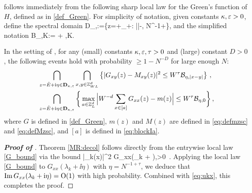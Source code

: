


 follows immediately from the following sharp local law for the Green's function of $H$, defined as in \eqref{def_Green}. For simplicity of notation, given constants $\kappa,{\varepsilon}>0$, define the spectral domain 
\be\label{eq:spectral_domain}
\mathbf D_{\kappa,\e}:=\{z=+\ii\eta \in \C_+: ||-\kappa, N^{-1+\e}\le \eta{}\},
\ee
and the simplified notation 
\be\label{eq:calBetaK}\cal B_{\eta,K}:=  + ,\quad \forall K.\ee

\begin{theorem}\label{MR:locSC} 
In the setting of , for any (small) constants $\kappa,{\varepsilon}, \tau>0$ and (large) constant $D>0$, the following events hold with probability $\ge 1-N^{-D}$ for large enough $N$: 
\begin{align}\label{G_bound}
&\bigcap_{z=\hat{E}+\mathrm{i}\eta\in \mathbf D_{\kappa,{\varepsilon}}}\bigcap_{x,y\in {\mathbb Z}_{WL}^d} \left\{ |G_{xy}(z) - M_{xy}(z)|^2  \le W^\tau  \mathcal B_{\eta,|x-y|}\right\}\, , 
\\
\label{G_bound_ave}
&\bigcap_{z=\hat{E}+\mathrm{i}\eta\in \mathbf D_{\kappa,{\varepsilon}}}\bigg\{\max_{a\in{\mathbb Z}_L^d} \Big|W^{-d}\sum_{x\in [a]}G_{xx}(z) - m(z) \Big| \le W^\tau  \mathcal B_{\eta,0}\bigg\}\, , 
\end{align}
where $G$ is defined in \eqref{def_Green}, $m(z)$ and $M(z)$ are defined in \eqref{eq:defmzsc} and \eqref{eq:defMzsc}, and $[a]$ is defined in \eqref{eq:blockIa}. %
\end{theorem}

\begin{proof}[\bf Proof of ]
Theorem \ref{MR:decol} follows directly from the entrywise local law \eqref{G_bound} via the bound 
\be\label{eq:ukx}|\boldsymbol{\psi}_k(x)|^2 \le \eta\im G_{xx}(\lambda_k + \ii \eta),\quad \forall \eta>0\, .\ee 
Applying the local law \eqref{G_bound} to $G_{xx}(\lambda_k+\ii\eta)$ with $\eta = N^{-1+\tau}$, we deduce that $\operatorname{{\mathrm{Im}}} G_{xx}(\lambda_k+\mathrm{i}\eta)=\operatorname{O}(1)$ with high probability. Combined with \eqref{eq:ukx}, this completes the proof.
\end{proof}

